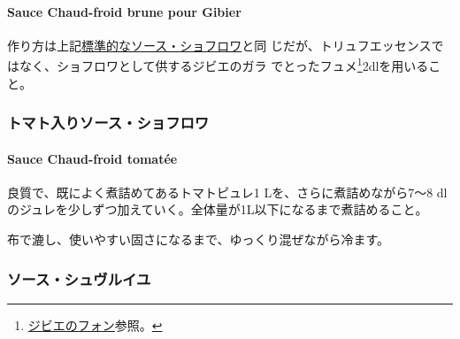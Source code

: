 \begin{recette}
\hypertarget{sauce-chaud-froid-brune-pour-gibier}{%
\paragraph{Sauce Chaud-froid brune pour
Gibier}\label{sauce-chaud-froid-brune-pour-gibier}}

  

作り方は上記\protect\hyperlink{sauce-chaud-froid-brune}{標準的なソース・ショフロワ}と同
じだが、トリュフエッセンスではなく、ショフロワとして供するジビエのガラ
でとったフュメ\footnote{\protect\hyperlink{fonds-de-gibier}{ジビエのフォン}参照。}2dlを用いること。

\maeaki

\hypertarget{ux30c8ux30deux30c8ux5165ux308aux30bdux30fcux30b9ux30b7ux30e7ux30d5ux30edux30ef}{%
\subsubsection{トマト入りソース・ショフロワ}\label{ux30c8ux30deux30c8ux5165ux308aux30bdux30fcux30b9ux30b7ux30e7ux30d5ux30edux30ef}}

\hypertarget{sauce-chaud-froid-tomatee}{%
\paragraph{Sauce Chaud-froid tomatée}\label{sauce-chaud-froid-tomatee}}


良質で、既によく煮詰めてあるトマトピュレ1 Lを、さらに煮詰めながら7〜8
dlのジュレを少しずつ加えていく。全体量が1L以下になるまで煮詰めること。

布で漉し、使いやすい固さになるまで、ゆっくり混ぜながら冷ます。

\maeaki

\hypertarget{ux30bdux30fcux30b9ux30b7ux30e5ux30f4ux30ebux30a4ux30e6}{%
\subsubsection{ソース・シュヴルイユ}\label{ux30bdux30fcux30b9ux30b7ux30e5ux30f4ux30ebux30a4ux30e6}}


\end{recette}
